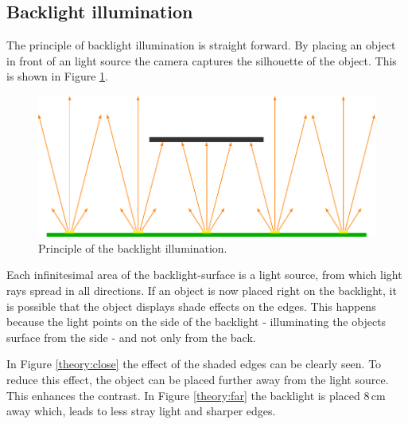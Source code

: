 \clearpage
\subsection{Backlight illumination}
The principle of backlight illumination is straight forward.
By placing an object in front of an light source the camera captures the silhouette of the object.
This is shown in Figure \ref{theory:backlight}.
\begin{figure}[ht]
	\centering
	\includegraphics[width=0.9\linewidth]{2-theory/backlight/object.pdf}
	\caption{Principle of the backlight illumination.\label{theory:backlight}}	
\end{figure}

Each infinitesimal area of the backlight-surface is a light source, from which light rays spread in all directions.
If an object is now placed right on the backlight, it is possible that the object displays shade effects on the edges.
This happens because the light points on the side of the backlight - illuminating the objects surface from the side - and not only from the back. 

In Figure \ref{theory:close} the effect of the shaded edges can be clearly seen.
To reduce this effect, the object can be placed further away from the light source.
This enhances the contrast.
In Figure \ref{theory:far} the backlight is placed 8\,cm away which, leads to less stray light and sharper edges.

